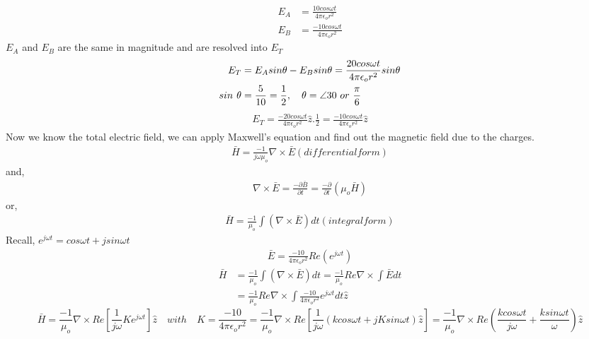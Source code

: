 \begin{exmp}
\begin{align*}
E_A &= \frac{10cos\omega t}{4\pi\epsilon_or^2}\\
E_B &= \frac{-10cos\omega t}{4\pi\epsilon_o r^2}
\end{align*}
$E_A$ and $E_B$ are the same in magnitude and are resolved into $E_T$
\begin{align*}
E_T &= E_Asin\theta - E_Bsin\theta = \frac{20cos\omega t}{4\pi\epsilon_o r^2}sin\theta \\
sin \hspace{0.05in} \theta &= \frac{5}{10} = \frac{1}{2}, \quad \theta = \angle {30} \ or \ \frac{\pi}{6}
\end{align*}
\begin{align*}
E_T = \frac{-20cos\omega t}{4\pi\epsilon_o r^2}\hat{z}.\frac{1}{2} = \frac{-10cos\omega t}{4\pi\epsilon_o r^2}\hat{z}
\end{align*}
Now we know the total electric field, we can apply Maxwell's equation and find out the magnetic field due to the charges.
\begin{align*}
\bar{H} = \frac{-1}{j\omega\mu_o}\nabla\times\bar{E}(differential form)
\end{align*}
and,
\begin{align*}
\nabla\times\bar{E} = \frac{-\partial\bar{B}}{\partial t} = \frac{-\partial}{\partial t}(\mu_o\bar{H})
\end{align*}
or,
\begin{align*}
\bar{H} = \frac{-1}{\mu_o}\int(\nabla\times\bar{E})dt(integral form)
\end{align*}
Recall, $ e^{j\omega t} = cos\omega t + j sin\omega t $
\begin{align*}
\bar{E} = \frac{-10}{4\pi\epsilon_o r^2}Re(e^{j\omega t})
\end{align*}
\begin{align*}
\bar{H} &= \frac{-1}{\mu_o}\int(\nabla\times\bar{E})dt = \frac{-1}{\mu_o}Re\nabla\times\int\bar{E}dt\\
&= \frac{-1}{\mu_o}Re\nabla\times\int\frac{-10}{4\pi\epsilon_o r^2}e^{j\omega t}dt\hat{z}
\end{align*}
\begin{dmath*}
\bar{H} = \frac{-1}{\mu_o}\nabla\times Re\left[\frac{1}{j\omega}Ke^{j\omega t} \right]\hat{z}\quad with\quad K =\frac{-10}{4\pi\epsilon_o r^2}
=\frac{-1}{\mu_o}\nabla\times Re\left[\frac{1}{j\omega}(kcos\omega t + j Ksin\omega t)\hat{z} \right]
= \frac{-1}{\mu_o}\nabla\times Re\left(\frac{kcos\omega t}{j\omega} + \frac{ksin\omega t}{\omega} \right)\hat{z}

\end{dmath*}
\end{exmp}
